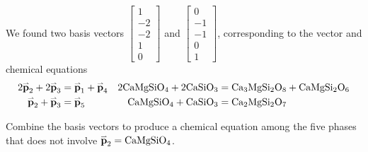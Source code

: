 \begin{activity}{10}
We found two basis vectors 
\(\begin{bmatrix} 1 \\ -2 \\ -2 \\ 1 \\ 0 \end{bmatrix}\) and 
\(\begin{bmatrix} 0 \\ -1 \\ -1 \\ 0 \\ 1 \end{bmatrix}\), 
corresponding to the vector and chemical equations
\begin{align*}
2\vec{p}_2 + 2 \vec{p}_3 &= \vec{p}_1 + \vec{p}_4 & 2{\rm CaMgSiO_4}+2{\rm CaSiO_3}&={\rm Ca_3MgSi_2O_8}+{\rm CaMgSi_2O_6}\\
\vec{p}_2 +\vec{p}_3 &= \vec{p}_5 &  {\rm CaMgSiO_4} + {\rm CaSiO_3} &= {\rm Ca_2MgSi_2O_7}
\end{align*}

Combine the basis vectors to produce a chemical equation among the five phases that does not involve \(\vec{p}_2 = {\rm CaMgSiO_4}\).
\end{activity}




